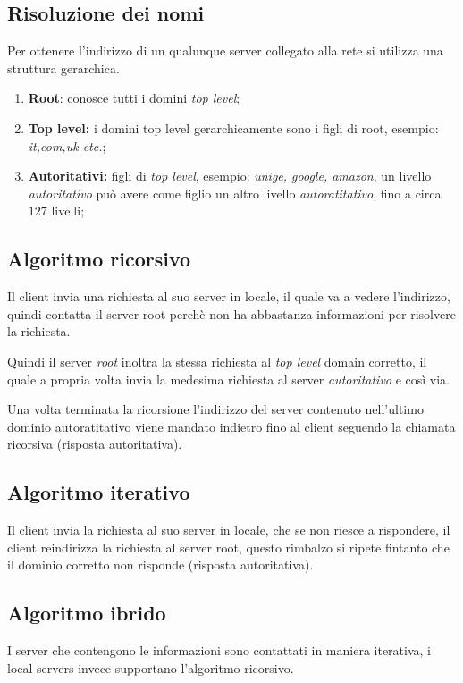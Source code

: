\subsection{Risoluzione dei nomi}
Per ottenere l'indirizzo di un qualunque server collegato alla rete si
utilizza una struttura gerarchica.

\begin{enumerate}
  \item \textbf{Root}: conosce tutti i domini \emph{top level};
  \item \textbf{Top level:} i domini top level gerarchicamente sono i figli di
    root, esempio: \emph{it,com,uk etc.};
  \item \textbf{Autoritativi:} figli di \emph{top level}, esempio: \emph{unige,
    google, amazon}, un livello \emph{autoritativo} può avere come figlio
    un altro livello \emph{autoratitativo}, fino a circa $127$ livelli;
\end{enumerate}

\subsection{Algoritmo ricorsivo}
Il client invia una richiesta al suo server in locale, il quale va a vedere
l'indirizzo, quindi contatta il server root perchè non ha abbastanza
informazioni per risolvere la richiesta.

Quindi il server \emph{root} inoltra la stessa richiesta al \emph{top level}
domain corretto, il quale a propria volta invia la medesima richiesta al server
\emph{autoritativo} e così via.

Una volta terminata la ricorsione l'indirizzo del server contenuto nell'ultimo
dominio autoratitativo viene mandato indietro fino al client seguendo la
chiamata ricorsiva (risposta autoritativa).

\subsection{Algoritmo iterativo}
Il client invia la richiesta al suo server in locale, che se non riesce a
rispondere, il client reindirizza la richiesta al server root, questo rimbalzo
si ripete fintanto che il dominio corretto non risponde (risposta
autoritativa).

\subsection{Algoritmo ibrido}
I server che contengono le informazioni sono contattati in maniera iterativa,
i local servers invece supportano l'algoritmo ricorsivo.

